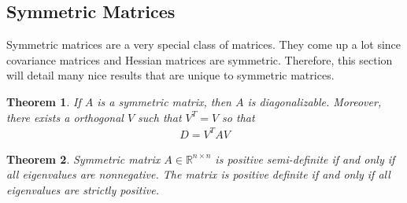 \documentclass[12pt]{article}
\numberwithin{equation}{section} %
\theoremstyle{plain}
\newtheorem{thm}{Theorem}[section]
\theoremstyle{definition}
\theoremstyle{remark}
\newcommand{\Rnn}{\mathbb{R}^{n\times n}}
\begin{document}
\subsection{Symmetric Matrices}

Symmetric matrices are a very special class of matrices. They come up a
lot since covariance matrices and Hessian matrices are symmetric.
Therefore, this section will detail many nice results that are unique to
symmetric matrices.

\begin{thm}
\label{thm:symmetric-diag}
If $A$ is a symmetric matrix, then $A$ is diagonalizable. Moreover,
there exists a orthogonal $V$ such that $V^T = V$ so that
\begin{align*}
  D = V^T A V
\end{align*}
\end{thm}

\begin{thm}
\label{thm:possemidef-eigenval}
Symmetric matrix $A\in\Rnn$ is positive semi-definite if and only if all
eigenvalues are nonnegative. The matrix is positive definite if and only
if all eigenvalues are strictly positive.
\end{thm}
\end{document}
